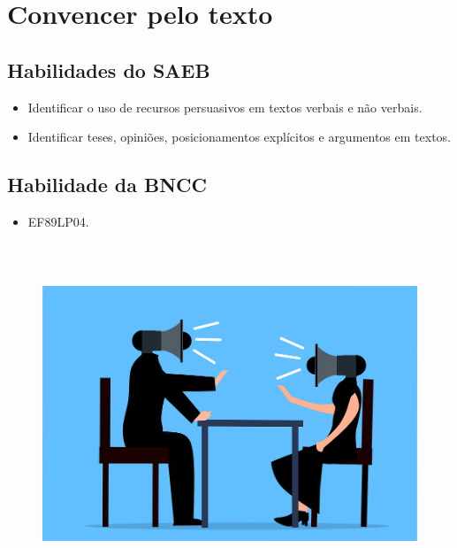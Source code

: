 \chapter{Convencer pelo texto}



\section{Habilidades do SAEB}

\begin{itemize}
\item
  Identificar o uso de recursos persuasivos em textos verbais e não
  verbais.
\item
  Identificar teses, opiniões, posicionamentos explícitos e argumentos
  em textos.
\end{itemize}

\section{Habilidade da BNCC}

\begin{itemize}
\item EF89LP04.
\end{itemize}


\begin{figure}
\centering
\includegraphics[width=5.90556in,height=4.00486in]{./_SAEB_9_POR/media/image1.png}
\end{figure}


